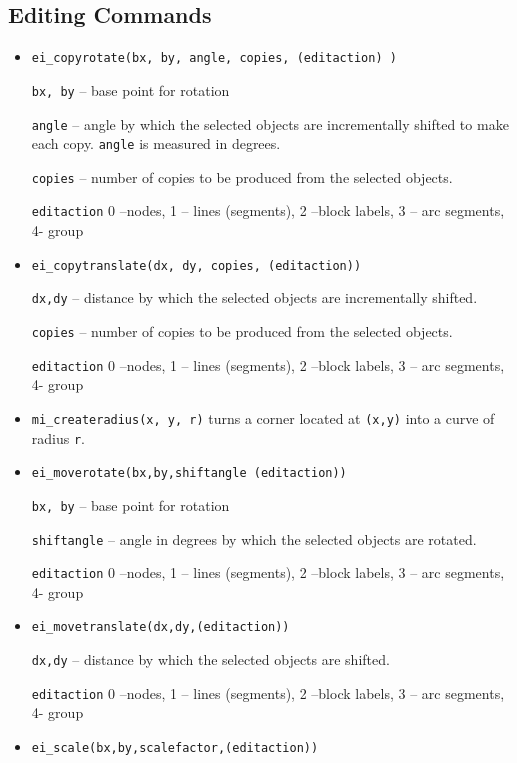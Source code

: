 \subsection{Editing Commands}
\begin{itemize}

\item \texttt{ei\_copyrotate(bx, by, angle, copies, (editaction) )}

\texttt{bx, by} -- base point for rotation

\texttt{angle} -- angle by which the selected objects are incrementally
shifted to make each copy. \texttt{angle} is measured in degrees.

\texttt{copies} -- number of copies to be produced from the selected
objects.

\texttt{editaction} 0 --nodes, 1 -- lines (segments), 2 --block labels, 3 --
arc segments, 4- group

\item \texttt{ei\_copytranslate(dx, dy, copies, (editaction))}

\texttt{dx,dy} -- distance by which the selected objects are incrementally
shifted.

\texttt{copies} -- number of copies to be produced from the selected
objects.

\texttt{editaction} 0 --nodes, 1 -- lines (segments), 2 --block labels, 3 --
arc segments, 4- group

\item{\tt mi\_createradius(x, y, r)} turns a corner located at {\tt (x,y)} into a curve of radius {\tt r}.

\item \texttt{ei\_moverotate(bx,by,shiftangle (editaction))}

\texttt{bx, by} -- base point for rotation

\texttt{shiftangle} -- angle in degrees by which the selected objects are
rotated.

\texttt{editaction} 0 --nodes, 1 -- lines (segments), 2 --block labels, 3 --
arc segments, 4- group

\item \texttt{ei\_movetranslate(dx,dy,(editaction))}

\texttt{dx,dy} -- distance by which the selected objects are shifted.

\texttt{editaction} 0 --nodes, 1 -- lines (segments), 2 --block labels, 3 --
arc segments, 4- group

\item \texttt{ei\_scale(bx,by,scalefactor,(editaction))}


\end{itemize}
